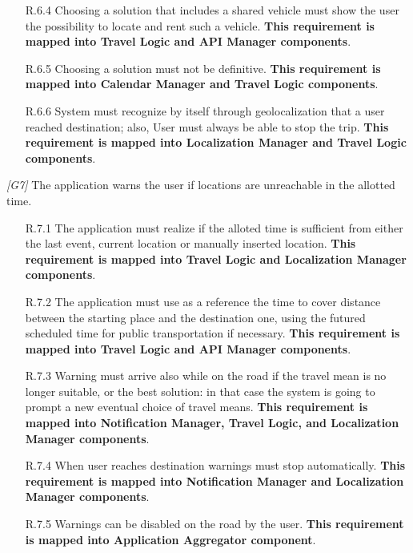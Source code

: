 \begin{description}
\begin{itemize}
			\item [R.6.4] Choosing a solution that includes a shared vehicle must show the user the possibility to locate and rent such a vehicle.
			\textbf{This requirement is mapped into Travel Logic and API Manager components}.

			\item [R.6.5] Choosing a solution must not be definitive.
			\textbf{This requirement is mapped into Calendar Manager and Travel Logic components}.

			\item [R.6.6] System must recognize by itself through geolocalization that a user reached destination; also, User must always be able to stop the trip.
			\textbf{This requirement is mapped into Localization Manager and Travel Logic components}.
		\end{itemize}



	\vskip0.75cm
	\item \textit{[G7]} The application warns the user if locations are unreachable in the allotted time.
		\begin{itemize}
			\item[R.7.1] The application must realize if the alloted time is sufficient from either the last event, current location or manually inserted location.
			\textbf{This requirement is mapped into Travel Logic and Localization Manager components}.

			\item[R.7.2] The application must use as a reference the time to cover distance between the starting place and the destination one, using the futured scheduled time for public transportation if necessary.
			\textbf{This requirement is mapped into Travel Logic and API Manager components}.

			\item [R.7.3] Warning must arrive also while on the road if the travel mean is no longer suitable, or the best solution: in that case the system is going to prompt a new eventual choice of travel means.
			\textbf{This requirement is mapped into Notification Manager, Travel Logic, and Localization Manager components}.

			\item [R.7.4] When user reaches destination warnings must stop automatically.
			\textbf{This requirement is mapped into Notification Manager and Localization Manager components}.

			\item [R.7.5] Warnings can be disabled on the road by the user.
			\textbf{This requirement is mapped into Application Aggregator component}.
		\end{itemize}



\end{description}
